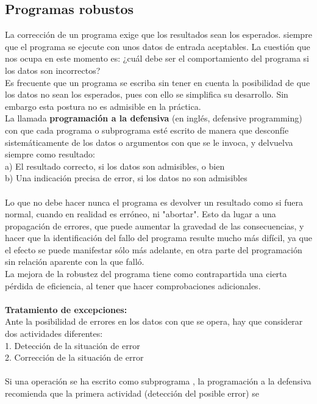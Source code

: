 \documentclass[11pt,a4paper]{article}
\begin{document}
  \subsection{Programas robustos}
  La corrección de un programa exige que los resultados sean los esperados.
  siempre que el programa se ejecute con unos datos de entrada aceptables. La
  cuestión que nos ocupa en este momento es: ¿cuál debe ser el comportamiento
  del programa si los datos son incorrectos?
  \\
  Es frecuente que un programa se escriba sin tener en
  cuenta la posibilidad de que los datos no sean los esperados, pues con ello se
  simplifica su desarrollo. Sin embargo esta postura no es admisible en la práctica.\\
  La llamada \textbf{programación a la defensiva} (en inglés, defensive programming)
  con que cada programa o subprograma esté escrito de manera que
  desconfíe sistemáticamente de los datos o argumentos con que se le invoca, y
  delvuelva siempre como resultado:\\
  a) El resultado correcto, si los datos son admisibles, o bien\\
  b) Una indicación precisa de error, si los datos no son admisibles\\
  \\
  Lo que no debe hacer nunca el programa es devolver un resultado como si fuera
  normal, cuando en realidad es erróneo, ni "abortar". Esto da lugar a una
  propagación de errores, que puede aumentar la gravedad de las consecuencias,
  y hacer que la identificación del fallo del programa resulte mucho más difícil,
  ya que el efecto se puede manifestar sólo más adelante, en otra parte del
  programación sin relación aparente con la que falló.\\
  La mejora de la robustez del programa tiene como contrapartida una cierta
  pérdida de eficiencia, al tener que hacer comprobaciones adicionales.\\
  \\
  \textbf{Tratamiento de excepciones:}\\
  Ante la posibilidad de errores en los datos con que se opera, hay que considerar
  dos actividades diferentes:\\
  1. Detección de la situación de error\\
  2. Corrección de la situación de error\\
  \\
  Si una operación se ha escrito como subprograma , la programación a la defensiva recomienda que la primera actividad (detección del posible error) se
\end{document}
